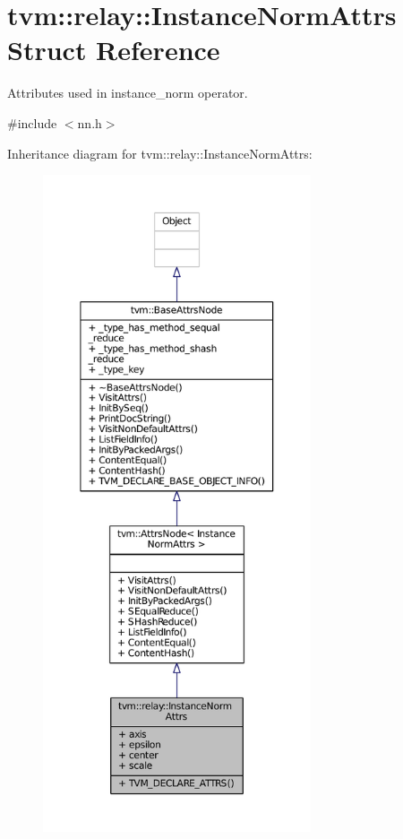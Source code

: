 \hypertarget{structtvm_1_1relay_1_1InstanceNormAttrs}{}\section{tvm\+:\+:relay\+:\+:Instance\+Norm\+Attrs Struct Reference}
\label{structtvm_1_1relay_1_1InstanceNormAttrs}


Attributes used in instance\+\_\+norm operator.  




{\ttfamily \#include $<$nn.\+h$>$}



Inheritance diagram for tvm\+:\+:relay\+:\+:Instance\+Norm\+Attrs\+:
\nopagebreak
\begin{figure}[H]
\begin{center}
\leavevmode
\includegraphics[height=550pt]{structtvm_1_1relay_1_1InstanceNormAttrs__inherit__graph}
\end{center}
\end{figure}



